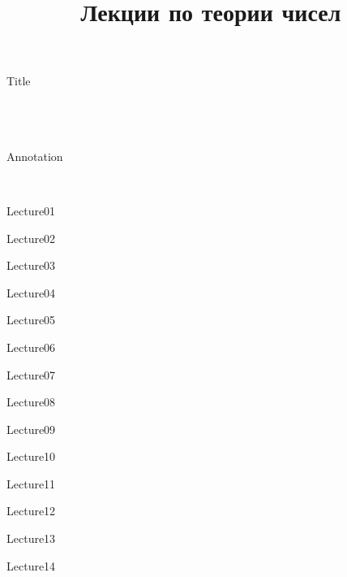 \documentclass[11pt]{article}
\DeclareMathOperator{\Ree}{Re}
\DeclareMathOperator{\Imm}{Im}
\begin{document}
\title{Лекции по теории чисел}

\theoremstyle{plain}
\newtheorem{theorem}{Теорема}[section]
\newtheorem{hypothesis}{Гипотеза}[section]
\newtheorem{lemma}[theorem]{Лемма}
\newtheorem{proposition}[theorem]{Предложение}
\newtheorem{corollary}{Следствие}
\newtheorem*{note}{Замечание}
\newtheorem{problem}{Задача}[section]
\newtheorem*{test}{Признак}

\theoremstyle{definition}
\newtheorem{definition}{Определение}[subsection]
\newtheorem{example}{Пример}[section]
\newtheorem{statement}{Утверждение}[section]

\theoremstyle{remark}
\newtheorem*{rem}{Замечание}

\newenvironment{solution}
  {\renewcommand\qedsymbol{$\blacksquare$}\begin{proof}[Решение]}
  {\end{proof}}

\renewcommand{\leq}{\leqslant}
\renewcommand{\geq}{\geqslant}

\renewcommand{\phi}{\varphi}
\renewcommand{\epsilon}{\varepsilon}

\renewcommand{\Re}{\Ree}
\renewcommand{\Im}{\Imm}

\thispagestyle{empty}

{Title}

\newpage
~\\~\\~\\
{Annotation}

~\\

\tableofcontents

\newpage


{Lecture01}

{Lecture02}

{Lecture03}

{Lecture04}

{Lecture05}

{Lecture06}

{Lecture07}

{Lecture08}

{Lecture09}

{Lecture10}

{Lecture11}

{Lecture12}

{Lecture13}

{Lecture14}
\end{document}
